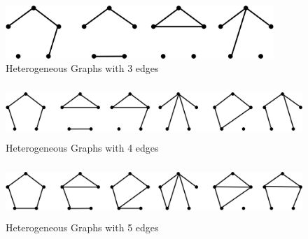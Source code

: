 \documentclass{oxmathproblems}
\begin{document}
\begin{figure}[hb]
    \begin{center}
    \includegraphics[height=2cm]{img/4-3.png}
    \caption{Heterogeneous Graphs with 3 edges}
    \label{fig:3}
    \end{center}
\end{figure}


\begin{figure}[hb]
    \begin{center}
    \includegraphics[height=2cm]{img/4-4.png}
    \caption{Heterogeneous Graphs with 4 edges}
    \label{fig:4}
    \end{center}
\end{figure}


\begin{figure}[hb]
    \begin{center}
    \includegraphics[height=2cm]{img/4-5.png}
    \caption{Heterogeneous Graphs with 5 edges}
    \label{fig:5}
    \end{center}
\end{figure}
\end{document}

